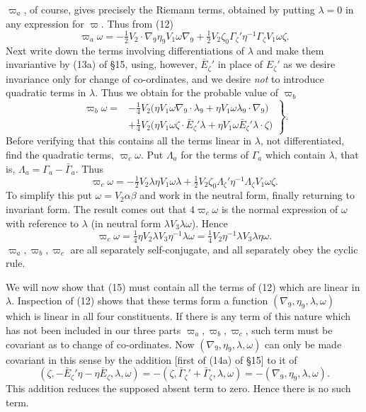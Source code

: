 \documentclass[11pt]{article}
\begin{document}
\indent $\varpi_a$, of course, gives precisely the Riemann terms, obtained by putting $\lambda=0$ in any expression for $\varpi$. Thus from (12)
\begin{equation}\varpi_a\omega=-\tfrac12V_2\mathbin{\cdot}\nabla_9\eta_9V_1\omega\nabla_9+\tfrac12V_2\zeta_0\Gamma_\zeta'\eta^{-1}\Gamma_\zeta V_1\omega\zeta.\tag{14}\end{equation}
Next write down the terms involving differentiations of $\lambda$ and make them invariantive by (13a) of \S15, using, however, $\bar E_\zeta'$ in place of $E_\zeta'$ as we desire invariance only for change of co-ordinates, and we desire \emph{not} to introduce quadratic terms in $\lambda$. Thus we obtain for the probable value of $\varpi_b$
\begin{equation}
\left.\begin{aligned}
\varpi_b\omega={}&-\tfrac14V_2\bigl(\eta V_1\omega\nabla_9\mathbin{\cdot}\lambda_9+\eta V_1\omega\lambda_9\mathbin{\cdot}\nabla_9\bigr)\\
&+\tfrac14V_2\bigl(\eta V_1\omega\zeta\mathbin{\cdot}\bar E_\zeta'\lambda+\eta V_1\omega\bar E_\zeta'\lambda\mathbin{\cdot}\zeta\bigr)
\end{aligned}\right\}.\tag{15}
\end{equation}
Before verifying that this contains all the terms linear in $\lambda$, not differentiated, find the quadratic terms, $\varpi_c\omega$. Put $\Lambda_a$ for the terms of $\Gamma_a$ which contain $\lambda$, that is, $\Lambda_a=\Gamma_a-\bar\Gamma_a$. Thus
\begin{equation}\varpi_c\omega=-\tfrac12V_2\lambda\eta V_1\omega\lambda+\tfrac12V_2\zeta_0\Lambda_\zeta'\eta^{-1}\Lambda_\zeta V_1\omega\zeta.\tag{16}\end{equation}
To simplify this put $\omega=V_2\alpha\beta$ and work in the neutral form, finally returning to invariant form. The result comes out that $4\varpi_c\omega$ is the normal expression of $\omega$ with reference to $\lambda$ (in neutral form $\lambda V_3\lambda\omega$). Hence
\begin{equation}\varpi_c\omega=\tfrac14\eta V_2\lambda V_3\eta^{-1}\lambda\omega=\tfrac14V_2\eta^{-1}\lambda V_3\lambda\eta\omega.\tag{17}\end{equation}
$\varpi_a,\varpi_b,\varpi_c$ are all separately self-conjugate, and all separately obey the cyclic rule.

\indent We will now show that (15) must contain all the terms of (12) which are linear in $\lambda$. Inspection of (12) shows that these terms form a function $(\nabla_9,\eta_9,\lambda,\omega)$ which is linear in all four constituents. If there is any term of this nature which has not been included in our three parts $\varpi_a,\varpi_b,\varpi_c$, such term must be covariant as to change of co-ordinates. Now $(\nabla_9,\eta_9,\lambda,\omega)$ can only be made covariant in this sense by the addition [first of (14a) of \S15] to it of
\[
(\zeta,-\bar E_\zeta'\eta-\eta\bar E_\zeta,\lambda,\omega)=-(\zeta,\bar\Gamma_\zeta'+\bar\Gamma_\zeta,\lambda,\omega)=-(\nabla_9,\eta_9,\lambda,\omega).
\]
This addition reduces the supposed absent term to zero. Hence there is no such term.
\end{document}
